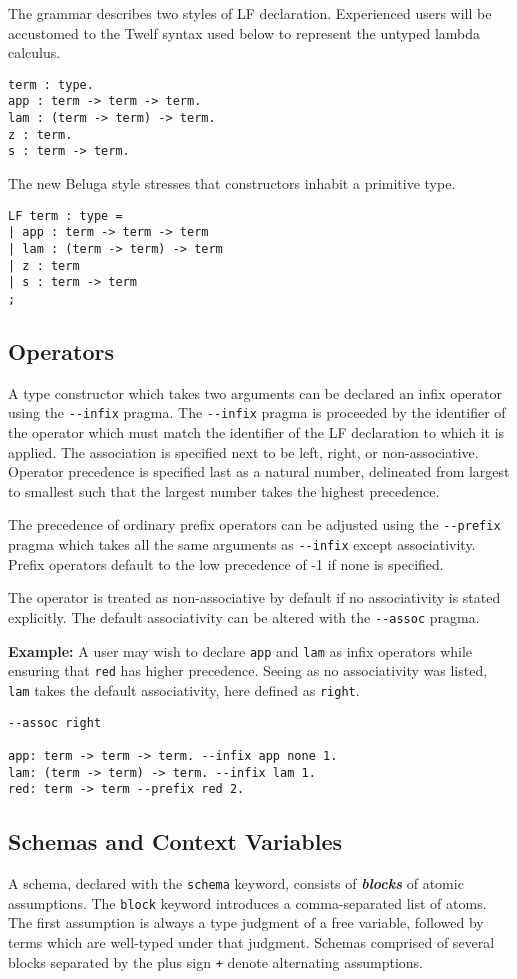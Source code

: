 \documentclass[11pt]{article}
\begin{document}
The grammar describes two styles of LF declaration. Experienced users will be accustomed to the Twelf syntax used below to represent the untyped lambda calculus.
\begin{verbatim}
term : type.
app : term -> term -> term.
lam : (term -> term) -> term.
z : term.
s : term -> term.
\end{verbatim}

The new Beluga style stresses that constructors inhabit a primitive type.
\begin{verbatim}
LF term : type =
| app : term -> term -> term
| lam : (term -> term) -> term
| z : term
| s : term -> term
;
\end{verbatim}

\subsection{Operators}
A type constructor which takes two arguments can be declared an infix operator using the \texttt{-{}-infix} pragma. The \texttt{-{}-infix} pragma is proceeded by the identifier of the operator which must match the identifier of the LF declaration to which it is applied. The association is specified next to be left, right, or non-associative. Operator precedence is specified last as a natural number, delineated from largest to smallest such that the largest number takes the highest precedence.

The precedence of ordinary prefix operators can be adjusted using the \texttt{-{}-prefix} pragma which takes all the same arguments as \texttt{-{}-infix} except associativity. Prefix operators default to the low precedence of -1 if none is specified.

The operator is treated as non-associative by default if no associativity is stated explicitly. The default associativity can be altered with the \texttt{-{}-assoc} pragma.

\textbf{Example:} A user may wish to declare \texttt{app} and \texttt{lam} as infix operators while ensuring that \texttt{red} has higher precedence. Seeing as no associativity was listed, \texttt{lam} takes the default associativity, here defined as \texttt{right}.
\begin{verbatim}
--assoc right

app: term -> term -> term. --infix app none 1.
lam: (term -> term) -> term. --infix lam 1.
red: term -> term --prefix red 2.
\end{verbatim}

\subsection{Schemas and Context Variables}
A schema, declared with the \texttt{schema} keyword, consists of \textbf{\textit{blocks}} of atomic assumptions. The \texttt{block} keyword introduces a comma-separated list of atoms. The first assumption is always a type judgment of a free variable, followed by terms which are well-typed under that judgment. Schemas comprised of several blocks separated by the plus sign \texttt{+} denote alternating assumptions.
\end{document}
